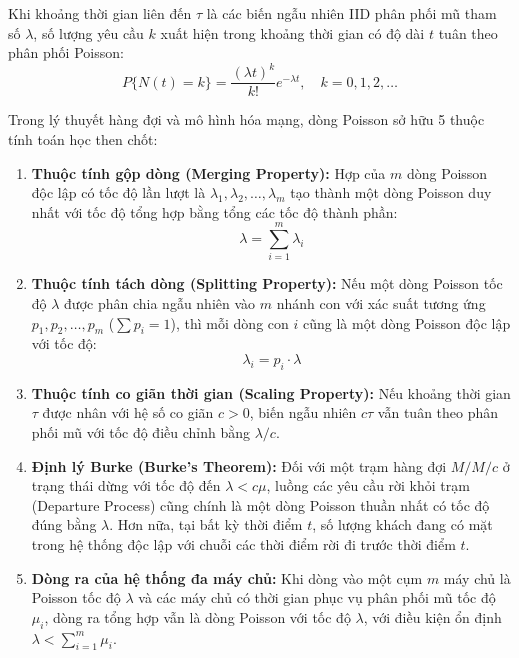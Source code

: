 \hspace{0.5cm}Khi khoảng thời gian liên đến $\tau$ là các biến ngẫu nhiên IID phân phối mũ tham số $\lambda$, số lượng yêu cầu $k$ xuất hiện trong khoảng thời gian có độ dài $t$ tuân theo phân phối Poisson:
\begin{equation}
    P\{N(t) = k\} = \frac{(\lambda t)^k}{k!} e^{-\lambda t}, \quad k = 0, 1, 2, \dots
\end{equation}

Trong lý thuyết hàng đợi và mô hình hóa mạng, dòng Poisson sở hữu 5 thuộc tính toán học then chốt:
\begin{enumerate}[leftmargin=1.5em]
    \item \textbf{Thuộc tính gộp dòng (Merging Property):} Hợp của $m$ dòng Poisson độc lập có tốc độ lần lượt là $\lambda_1, \lambda_2, \dots, \lambda_m$ tạo thành một dòng Poisson duy nhất với tốc độ tổng hợp bằng tổng các tốc độ thành phần:
    \begin{equation}
        \lambda = \sum_{i=1}^m \lambda_i
    \end{equation}
    \item \textbf{Thuộc tính tách dòng (Splitting Property):} Nếu một dòng Poisson tốc độ $\lambda$ được phân chia ngẫu nhiên vào $m$ nhánh con với xác suất tương ứng $p_1, p_2, \dots, p_m$ ($\sum p_i = 1$), thì mỗi dòng con $i$ cũng là một dòng Poisson độc lập với tốc độ:
    \begin{equation}
        \lambda_i = p_i \cdot \lambda
    \end{equation}
    \item \textbf{Thuộc tính co giãn thời gian (Scaling Property):} Nếu khoảng thời gian $\tau$ được nhân với hệ số co giãn $c > 0$, biến ngẫu nhiên $c\tau$ vẫn tuân theo phân phối mũ với tốc độ điều chỉnh bằng $\lambda / c$.
    \item \textbf{Định lý Burke (Burke's Theorem):} Đối với một trạm hàng đợi $M/M/c$ ở trạng thái dừng với tốc độ đến $\lambda < c\mu$, luồng các yêu cầu rời khỏi trạm (Departure Process) cũng chính là một dòng Poisson thuần nhất có tốc độ đúng bằng $\lambda$. Hơn nữa, tại bất kỳ thời điểm $t$, số lượng khách đang có mặt trong hệ thống độc lập với chuỗi các thời điểm rời đi trước thời điểm $t$.
    \item \textbf{Dòng ra của hệ thống đa máy chủ:} Khi dòng vào một cụm $m$ máy chủ là Poisson tốc độ $\lambda$ và các máy chủ có thời gian phục vụ phân phối mũ tốc độ $\mu_i$, dòng ra tổng hợp vẫn là dòng Poisson với tốc độ $\lambda$, với điều kiện ổn định $\lambda < \sum_{i=1}^m \mu_i$.
\end{enumerate}

